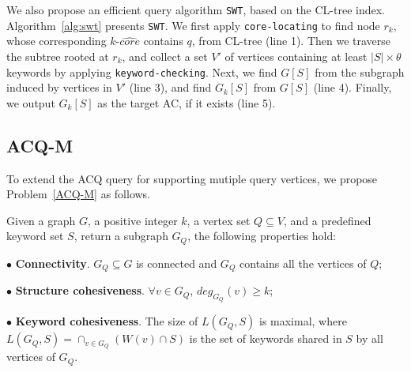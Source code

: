 {We also propose an efficient query algorithm {\tt SWT}, based on the CL-tree index.
Algorithm~\ref{alg:swt} presents {\tt SWT}. We first apply {\tt core-locating} to find node $r_k$, whose corresponding $k$-$\widehat {core}$ contains $q$, from CL-tree (line 1).
Then we traverse the subtree rooted at $r_k$, and collect a set $V'$ of vertices containing at least $|S|\times \theta$ keywords by applying {\tt keyword-checking}.
Next, we find $G[S]$ from the subgraph induced by vertices in $V'$ (line 3),
and find $G_k[S]$ from $G[S]$ (line 4).
Finally, we output $G_k[S]$ as the target AC, if it exists (line 5).



\subsection{ACQ-M}

To extend the ACQ query for supporting mutiple query vertices, we propose Problem~\ref{ACQ-M} as follows.

\begin{problem}
\label{ACQ-M}
Given a graph $G$, a positive integer $k$, a vertex set $Q$$\subseteq$$V$, and a predefined keyword set $S$, return a subgraph $G_Q$, the following properties hold:

$\bullet$ \textbf{Connectivity}. $G_Q \subseteq G$ is connected and $G_Q$ contains all the vertices of $Q$;

$\bullet$ \textbf{Structure cohesiveness}. $\forall$$v\in G_Q$, $deg_{G_Q}(v)\geq$$k$;

$\bullet$ \textbf{Keyword cohesiveness}. The size of $L(G_Q, S)$ is maximal, where $L(G_Q, S)=\cap_{v \in G_Q}(W(v)\cap S)$ is the set of keywords shared in $S$ by all vertices of $G_Q$.
\end{problem}

}
